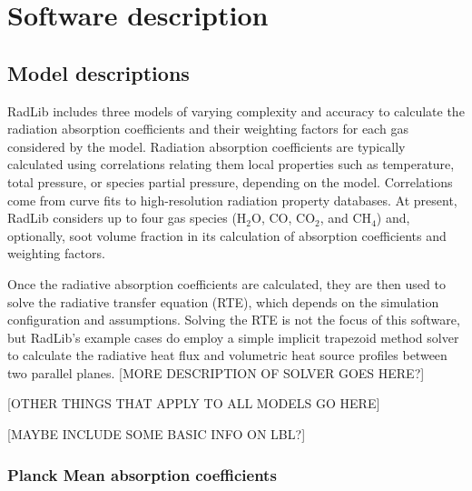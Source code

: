 \documentclass[preprint,12pt, a4paper]{elsarticle}
\begin{document}
\section{Software description}
\label{s:description}


\subsection{Model descriptions}
\label{s:models}

RadLib includes three models of varying complexity and accuracy to calculate the radiation absorption coefficients and their weighting factors for each gas considered by the model. Radiation absorption coefficients are typically calculated using correlations relating them local properties such as temperature, total pressure, or species partial pressure, depending on the model. Correlations come from curve fits to high-resolution radiation property databases. At present, RadLib considers up to four gas species (H$_2$O, CO, CO$_2$, and CH$_4$) and, optionally, soot volume fraction in its calculation of absorption coefficients and weighting factors. 

Once the radiative absorption coefficients are calculated, they are then used to solve the radiative transfer equation (RTE), which depends on the simulation configuration and assumptions. Solving the RTE is not the focus of this software, but RadLib's example cases do employ a simple implicit trapezoid method solver to calculate the radiative heat flux and volumetric heat source profiles between two parallel planes. [MORE DESCRIPTION OF SOLVER GOES HERE?]

[OTHER THINGS THAT APPLY TO ALL MODELS GO HERE]

[MAYBE INCLUDE SOME BASIC INFO ON LBL?]

\subsubsection{Planck Mean absorption coefficients}
\label{s:planckmean}
\end{document}
